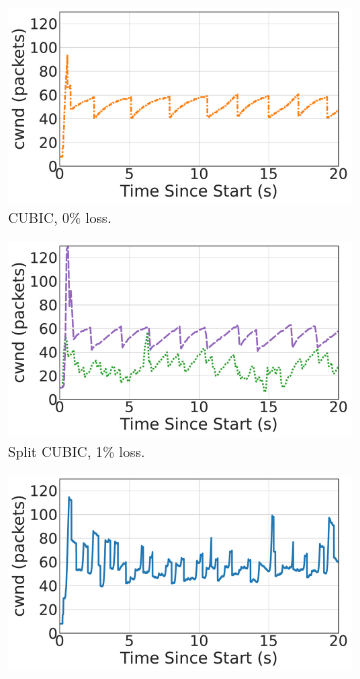 \begin{figure}[ht]
\begin{subfigure}{0.32\linewidth}
  \includegraphics[width=\linewidth]{sidekick/figures/cwnd_cubic_loss0p.pdf}
  \caption{CUBIC, 0\% loss.}
  \label{fig:time-cwnd:cubic-loss0p}
\end{subfigure}
\begin{subfigure}{0.32\linewidth}
  \includegraphics[width=\linewidth]{sidekick/figures/cwnd_split_loss1p.pdf}
  \caption{Split CUBIC, 1\% loss.}
  \label{fig:time-cwnd:split-loss1p}
\end{subfigure}
\begin{subfigure}{0.32\linewidth}
  \includegraphics[width=\linewidth]{sidekick/figures/cwnd_pacubic_loss1p.pdf}

\end{subfigure}
\end{figure}
